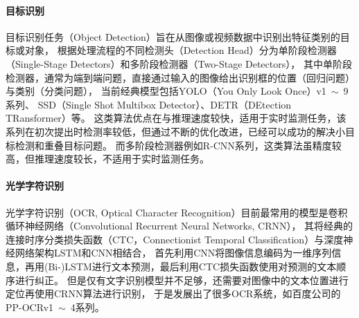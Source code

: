 \paragraph*{目标识别}
目标识别任务（Object Detection）旨在从图像或视频数据中识别出特征类别的目标或对象，
根据处理流程的不同检测头（Detection Head）分为单阶段检测器（Single-Stage Detectors）和多阶段检测器（Two-Stage Detectors），
其中单阶段检测器，通常为端到端问题，直接通过输入的图像给出识别框的位置（回归问题）与类别（分类问题），
当前经典模型包括YOLO（You Only Look Once）v1~$\sim$~9系列、
SSD（Single Shot Multibox Detector）、DETR（DEtection TRansformer）等。
这类算法优点在与推理速度较快，适用于实时监测任务，该系列在初次提出时检测率较低，但通过不断的优化改进，已经可以成功的解决小目标检测和重叠目标问题。
而多阶段检测器例如R-CNN系列，这类算法虽精度较高，但推理速度较长，不适用于实时监测任务。
\paragraph*{光学字符识别}
光学字符识别（OCR, Optical Character Recognition）目前最常用的模型是卷积循环神经网络（Convolutional Recurrent Neural Networks, CRNN），
其将经典的连接时序分类损失函数（CTC，Connectionist Temporal Classification）与深度神经网络架构LSTM和CNN相结合，
首先利用CNN将图像信息编码为一维序列信息，再用(Bi-)LSTM进行文本预测，最后利用CTC损失函数使用对预测的文本顺序进行纠正。
但是仅有文字识别模型并不足够，还需要对图像中的文本位置进行定位再使用CRNN算法进行识别，
于是发展出了很多OCR系统，如百度公司的PP-OCRv1~$\sim$~4系列。

